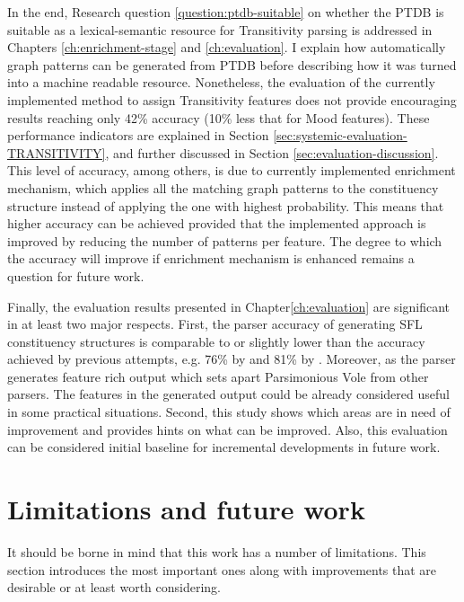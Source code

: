     In the end, Research question \ref{question:ptdb-suitable} on whether the PTDB is suitable as a lexical-semantic resource for Transitivity parsing is addressed in Chapters \ref{ch:enrichment-stage} and \ref{ch:evaluation}. I explain how automatically graph patterns can be generated from PTDB before describing how it was turned into a machine readable resource. Nonetheless, the evaluation of the currently implemented method to assign Transitivity features does not provide encouraging results reaching only 42\% accuracy (10\% less that for Mood features). These performance indicators are explained in Section \ref{sec:systemic-evaluation-TRANSITIVITY}, and further discussed in Section \ref{sec:evaluation-discussion}. This level of accuracy, among others, is due to currently implemented enrichment mechanism, which applies all the matching graph patterns to the constituency structure instead of applying the one with highest probability. This means that higher accuracy can be achieved provided that the implemented approach is improved by reducing the number of patterns per feature. The degree to which the accuracy will improve if enrichment mechanism is enhanced remains a question for future work. 
    
    Finally, the evaluation results presented in Chapter\ref{ch:evaluation} are significant in at least two major respects. First, the parser accuracy of generating SFL constituency structures is comparable to or slightly lower than the accuracy achieved by previous attempts, e.g. 76\% by \citet{Souter1996} and 81\% by \citet{ODonoghue91}. Moreover, as the parser generates feature rich output which sets apart Parsimonious Vole from other parsers. The features in the generated output could be already considered useful in some practical situations.
    Second, this study shows which areas are in need of improvement and provides hints on what can be improved. Also, this evaluation can be considered initial baseline for incremental developments in future work.
    
\section{Limitations and future work}

    It should be borne in mind that this work has a number of limitations. This section introduces the most important ones along with improvements that are desirable or at least worth considering.
    

